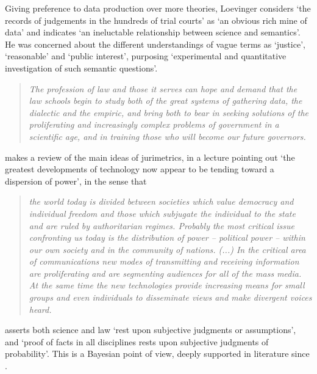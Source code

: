 \documentclass[a4paper]{exam}
\theoremstyle{plain}
\begin{document}
Giving preference to data production over more theories, Loevinger considers `the records of judgements in the hundreds of trial courts' as `an obvious rich mine of data' and indicates `an ineluctable relationship between science and semantics'. He was concerned about the different understandings of vague terms as `justice', `reasonable' and `public interest', purposing `experimental and quantitative investigation of such semantic questions'. 

\begin{quote}
\textit{The profession of law and those it serves can hope and demand that the law schools begin to study both of the great systems of gathering data, the dialectic and the empiric, and bring both to bear in seeking solutions of the proliferating and increasingly complex problems of government in a scientific age, and in training those who will become our future governors.} \cite[p. 551]{loevinger1966law}
\end{quote}

\cite{loevinger1985science} makes a review of the main ideas of jurimetrics, in a lecture pointing out `the greatest developments of technology now appear to be tending toward a dispersion of power', in the sense that

\begin{quote}
\textit{the world today is divided between societies which value democracy and individual freedom and those which subjugate the individual to the state and are ruled by authoritarian regimes. Probably the most critical issue confronting us today is the distribution of power -- political power -- within our own society and in the community of nations. (...) In the critical area of communications new modes of transmitting and receiving information are proliferating and are segmenting audiences for all of the mass media. At the same time the new technologies provide increasing means for small groups and even individuals to disseminate views and make divergent voices heard.} \cite[p. 19]{loevinger1985science}
\end{quote}

\cite{loevinger1992standards} asserts both science and law `rest upon subjective judgments or assumptions', and `proof of facts in all disciplines rests upon subjective judgments of probability'. This is a Bayesian point of view, deeply supported in literature since \cite{bayes1763essay}.
\end{document}
